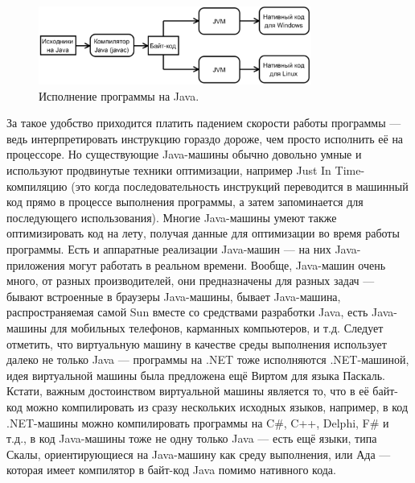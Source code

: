 \documentclass[a5paper]{article}
\begin{document}
\begin{figure}
	\begin{center}
		\includegraphics[width=0.8\textwidth]{javaCompiling.png}
	\end{center}
	\caption{Исполнение программы на Java.}
	\label{figure1}
\end{figure}

За такое удобство приходится платить падением скорости работы программы --- ведь интерпретировать инструкцию гораздо дороже, чем просто исполнить её на процессоре. Но существующие Java-машины обычно довольно умные и используют продвинутые техники оптимизации, например Just In Time-компиляцию (это когда последовательность инструкций переводится в машинный код прямо в процессе выполнения программы, а затем запоминается для последующего использования). Многие Java-машины умеют также оптимизировать код на лету, получая данные для оптимизации во время работы программы. Есть и аппаратные реализации Java-машин --- на них Java-приложения могут работать в реальном времени. Вообще, Java-машин очень много, от разных производителей, они предназначены для разных задач --- бывают встроенные в браузеры Java-машины, бывает Java-машина, распространяемая самой Sun вместе со средствами разработки Java, есть Java-машины для мобильных телефонов, карманных компьютеров, и т.д. Следует отметить, что виртуальную машину в качестве среды выполнения использует далеко не только Java --- программы на .NET тоже исполняются .NET-машиной, идея виртуальной машины была предложена ещё Виртом для языка Паскаль. Кстати, важным достоинством виртуальной машины является то, что в её байт-код можно компилировать из сразу нескольких исходных языков, например, в код .NET-машины можно компилировать программы на C\#, C++, Delphi, F\# и т.д., в код Java-машины тоже не одну только Java --- есть ещё языки, типа Скалы, ориентирующиеся на Java-машину как среду выполнения, или Ада --- которая имеет компилятор в байт-код Java помимо нативного кода.
\end{document}
